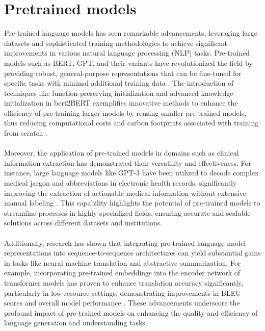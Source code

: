 \section{Pretrained models}
Pre-trained language models has seen remarkable advancements, leveraging large datasets and sophisticated training methodologies to achieve significant improvements in various natural language processing (NLP) tasks. Pre-trained models such as BERT, GPT, and their variants have revolutionized the field by providing robust, general-purpose representations that can be fine-tuned for specific tasks with minimal additional training data \cite{chen-etal-2022-bert2bert}. The introduction of techniques like function-preserving initialization and advanced knowledge initialization in bert2BERT exemplifies innovative methods to enhance the efficiency of pre-training larger models by reusing smaller pre-trained models, thus reducing computational costs and carbon footprints associated with training from scratch \cite{chen-etal-2022-bert2bert}.
\\\\
Moreover, the application of pre-trained models in domains such as clinical information extraction has demonstrated their versatility and effectiveness. For instance, large language models like GPT-3 have been utilized to decode complex medical jargon and abbreviations in electronic health records, significantly improving the extraction of actionable medical information without extensive manual labeling \cite{agrawal2022large}. This capability highlights the potential of pre-trained models to streamline processes in highly specialized fields, ensuring accurate and scalable solutions across different datasets and institutions.
\\\\
Additionally, research has shown that integrating pre-trained language model representations into sequence-to-sequence architectures can yield substantial gains in tasks like neural machine translation and abstractive summarization. For example, incorporating pre-trained embeddings into the encoder network of transformer models has proven to enhance translation accuracy significantly, particularly in low-resource settings, demonstrating improvements in BLEU scores and overall model performance \cite{edunov-etal-2019-pre}. These advancements underscore the profound impact of pre-trained models on enhancing the quality and efficiency of language generation and understanding tasks.
\\\\
